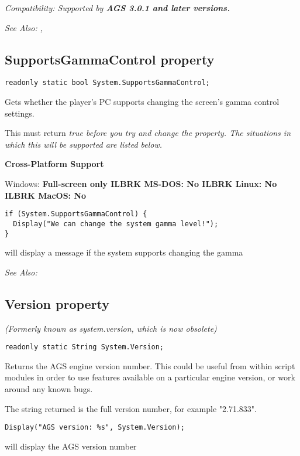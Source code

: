 \it{Compatibility:} Supported by \bf{AGS 3.0.1} and later versions.

\it{See Also:} ,


\subsection{SupportsGammaControl property}\label{System.SupportsGammaControl}%

\begin{verbatim}
readonly static bool System.SupportsGammaControl;
\end{verbatim}
Gets whether the player's PC supports changing the screen's gamma control settings.

This must return \it{true} before you try and change the  property.
The situations in which this will be supported are listed below.

\bf{Cross-Platform Support}

Windows: \bf{ Full-screen only }ILBRK
MS-DOS: \bf{ No }ILBRK
Linux: \bf{ No }ILBRK
MacOS: \bf{ No }

\begin{verbatim}
if (System.SupportsGammaControl) {
  Display("We can change the system gamma level!");
}
\end{verbatim}
will display a message if the system supports changing the gamma

\it{See Also:} 


\subsection{Version property}\label{System.Version}%

\it{(Formerly known as system.version, which is now obsolete)}

\begin{verbatim}
readonly static String System.Version;
\end{verbatim}
Returns the AGS engine version number. This could be useful from within script modules
in order to use features available on a particular engine version, or work around
any known bugs.

The string returned is the full version number, for example "2.71.833".

\begin{verbatim}
Display("AGS version: %s", System.Version);
\end{verbatim}
will display the AGS version number


